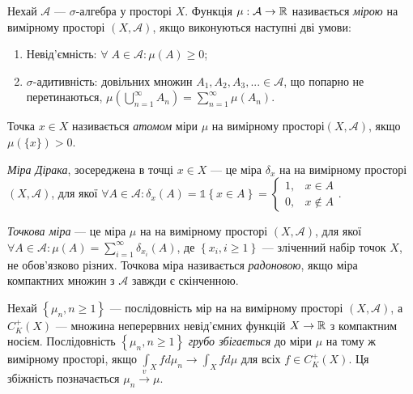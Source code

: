 \begin{definition}
    Нехай $\mathcal{A}$ --- $\sigma$-алгебра
    у просторі $X$. Функція $\mu: \mathcal{A} \to \mathbb{R}$ називається
    \emph{мірою} на вимірному просторі $\left(X, \mathcal{A}\right)$, якщо виконуються наступні дві умови:
    \begin{enumerate}
        \item Невід'ємність: $\forall \; A \in \mathcal{A} : \mu(A) \geq 0$;
        \item $\sigma$-адитивність: довільних множин $A_1, A_2, A_3, ... \in \mathcal{A}$,
        що попарно не перетинаються, 
        $\mu\left(\bigcup_{n=1}^{\infty} A_n\right) = \sum_{n=1}^{\infty}\mu(A_n)$.
    \end{enumerate}
\end{definition}
\begin{definition}
    Точка $x \in X$ називається \emph{атомом} міри $\mu$ на
    вимірному просторі$\left(X, \mathcal{A}\right)$, якщо $\mu\left(\{x \}\right) > 0$.
\end{definition}
\begin{definition}
    \emph{Міра Дірака}, зосереджена
    в точці $x \in X$ --- це міра $\delta_x$ на 
    на вимірному просторі $\left(X, \mathcal{A}\right)$,
    для якої $\forall A \in \mathcal{A}: \delta_x(A) = \mathds{1}\left\{x \in A\right\} = 
    \begin{cases}
        1, & x \in A \\
        0, & x \notin A
    \end{cases}$.
\end{definition}
\begin{definition}
    \emph{Точкова міра} --- це міра $\mu$ на 
    на вимірному просторі $\left(X, \mathcal{A}\right)$,
    для якої $\forall A \in \mathcal{A}: \mu(A) = \sum_{i=1}^{\infty} \delta_{x_i}(A)$,
    де $\left\{x_i, i \geq 1\right\}$ --- зліченний набір точок $X$, не обов'язково різних.
    Точкова міра називається \emph{радоновою},
    якщо міра компактних множин з $\mathcal{A}$ завжди є скінченною.
\end{definition}
\begin{definition}
    Нехай $\left\{\mu_n, n \geq 1\right\}$ --- послідовність мір на
    на вимірному просторі $\left(X, \mathcal{A}\right)$,
    а $C_K^+(X)$ --- множина неперервних невід'ємних функцій
    $X \to \mathbb{R}$ з компактним носієм.
    Послідовність $\left\{\mu_n, n \geq 1\right\}$
    \emph{грубо збігається} до міри $\mu$ на тому ж вимірному просторі,
    якщо $\int_X f d\mu_n \to \int_X f d\mu$ для всіх $f \in C_K^+(X)$.
    Ця збіжність позначається $\mu_n \overset{v}{\longrightarrow} \mu$.
\end{definition}